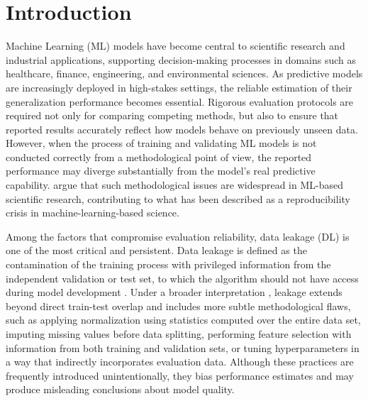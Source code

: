 \chapter{Introduction}
\label{cap:introducao}

Machine Learning (ML) models have become central to scientific research and
industrial applications, supporting decision-making processes in domains such as
healthcare, finance, engineering, and environmental sciences. As predictive
models are increasingly deployed in high-stakes settings, the reliable estimation
of their generalization performance becomes essential. Rigorous evaluation
protocols are required not only for comparing competing methods, but also to
ensure that reported results accurately reflect how models behave on previously
unseen data. However, when the process of training and validating ML models is
not conducted correctly from a methodological point of view, the reported
performance may diverge substantially from the model's real predictive
capability.  argue that such methodological issues are
widespread in ML-based scientific research, contributing to what has been
described as a reproducibility crisis in machine-learning-based science.

Among the factors that compromise evaluation reliability, data leakage (DL) is
one of the most critical and persistent. Data leakage is defined as the
contamination of the training process with privileged information from the
independent validation or test set, to which the algorithm should not have access
during model development \cite{kaufman2012}. Under a broader interpretation
\cite{kapoor2023}, leakage extends beyond direct train-test overlap and includes
more subtle methodological flaws, such as applying normalization using statistics
computed over the entire data set, imputing missing values before data splitting,
performing feature selection with information from both training and validation
sets, or tuning hyperparameters in a way that indirectly incorporates evaluation
data. Although these practices are frequently introduced unintentionally, they
bias performance estimates and may produce misleading conclusions about model
quality.

